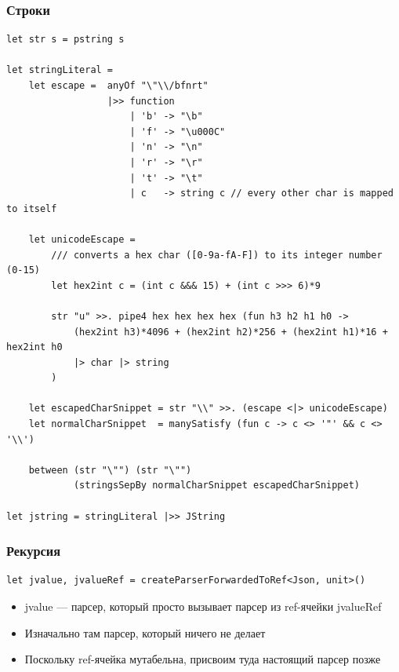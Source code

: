 \documentclass[xetex,mathserif,serif]{beamer}
\begin{document}
    \begin{frame}[fragile]
        \frametitle{Строки}
        \begin{tiny}
            \begin{verbatim}
let str s = pstring s

let stringLiteral =
    let escape =  anyOf "\"\\/bfnrt"
                  |>> function
                      | 'b' -> "\b"
                      | 'f' -> "\u000C"
                      | 'n' -> "\n"
                      | 'r' -> "\r"
                      | 't' -> "\t"
                      | c   -> string c // every other char is mapped to itself

    let unicodeEscape =
        /// converts a hex char ([0-9a-fA-F]) to its integer number (0-15)
        let hex2int c = (int c &&& 15) + (int c >>> 6)*9

        str "u" >>. pipe4 hex hex hex hex (fun h3 h2 h1 h0 ->
            (hex2int h3)*4096 + (hex2int h2)*256 + (hex2int h1)*16 + hex2int h0
            |> char |> string
        )

    let escapedCharSnippet = str "\\" >>. (escape <|> unicodeEscape)
    let normalCharSnippet  = manySatisfy (fun c -> c <> '"' && c <> '\\')

    between (str "\"") (str "\"")
            (stringsSepBy normalCharSnippet escapedCharSnippet)

let jstring = stringLiteral |>> JString
            \end{verbatim}
        \end{tiny}
    \end{frame}

    \begin{frame}[fragile]
        \frametitle{Рекурсия}
        \begin{verbatim}
let jvalue, jvalueRef = createParserForwardedToRef<Json, unit>()
        \end{verbatim}
        \begin{itemize}
            \item jvalue --- парсер, который просто вызывает парсер из ref-ячейки jvalueRef
            \item Изначально там парсер, который ничего не делает
            \item Поскольку ref-ячейка мутабельна, присвоим туда настоящий парсер позже
        \end{itemize}
    \end{frame}
\end{document}
